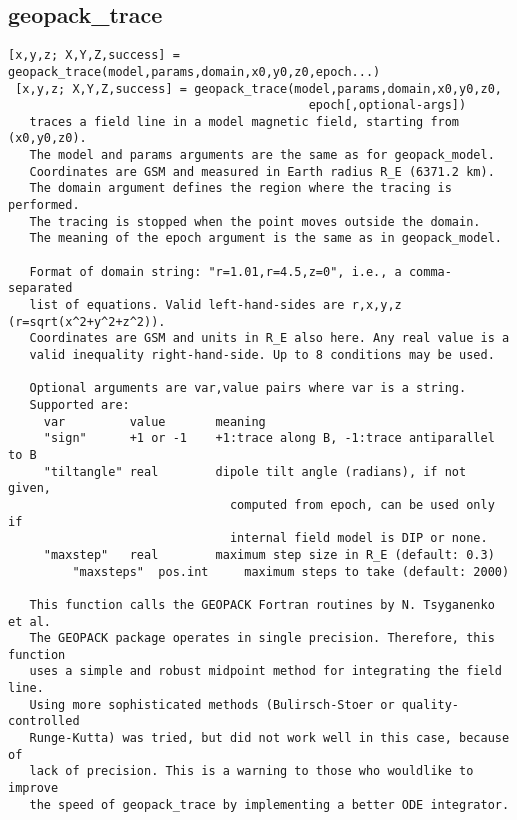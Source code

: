 \documentclass[a4paper]{article}
\begin{document}
\subsection{geopack\_trace\label{geopack_trace}}

\begin{tscreen}
\begin{verbatim}
[x,y,z; X,Y,Z,success] = geopack_trace(model,params,domain,x0,y0,z0,epoch...)
 [x,y,z; X,Y,Z,success] = geopack_trace(model,params,domain,x0,y0,z0,
                                          epoch[,optional-args])
   traces a field line in a model magnetic field, starting from (x0,y0,z0).
   The model and params arguments are the same as for geopack_model.
   Coordinates are GSM and measured in Earth radius R_E (6371.2 km).
   The domain argument defines the region where the tracing is performed.
   The tracing is stopped when the point moves outside the domain.
   The meaning of the epoch argument is the same as in geopack_model.

   Format of domain string: "r=1.01,r=4.5,z=0", i.e., a comma-separated
   list of equations. Valid left-hand-sides are r,x,y,z (r=sqrt(x^2+y^2+z^2)).
   Coordinates are GSM and units in R_E also here. Any real value is a
   valid inequality right-hand-side. Up to 8 conditions may be used.

   Optional arguments are var,value pairs where var is a string.
   Supported are:
     var         value       meaning
     "sign"      +1 or -1    +1:trace along B, -1:trace antiparallel to B
     "tiltangle" real        dipole tilt angle (radians), if not given,
                               computed from epoch, can be used only if
                               internal field model is DIP or none.
     "maxstep"   real        maximum step size in R_E (default: 0.3)
         "maxsteps"  pos.int     maximum steps to take (default: 2000)

   This function calls the GEOPACK Fortran routines by N. Tsyganenko et al.
   The GEOPACK package operates in single precision. Therefore, this function
   uses a simple and robust midpoint method for integrating the field line.
   Using more sophisticated methods (Bulirsch-Stoer or quality-controlled
   Runge-Kutta) was tried, but did not work well in this case, because of
   lack of precision. This is a warning to those who wouldlike to improve
   the speed of geopack_trace by implementing a better ODE integrator.


\end{verbatim}
\end{tscreen}
\end{document}
